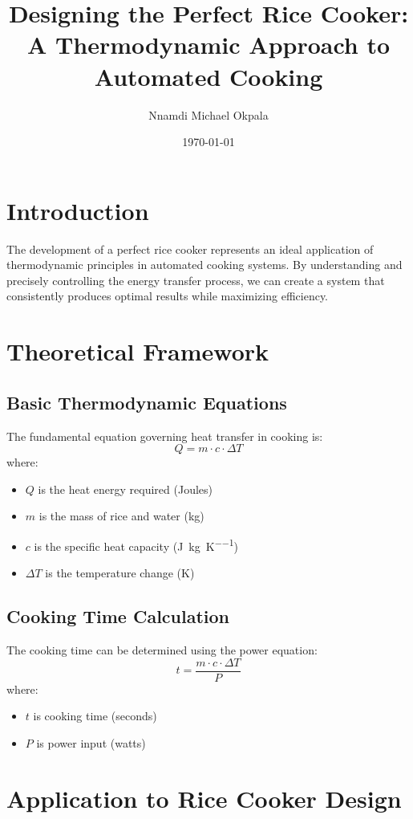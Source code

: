 \documentclass{article}
\title{Designing the Perfect Rice Cooker: \\A Thermodynamic Approach to Automated Cooking}
\author{Nnamdi Michael Okpala}
\date{\today}
\begin{document}
\maketitle

\section{Introduction}
The development of a perfect rice cooker represents an ideal application of thermodynamic principles in automated cooking systems. By understanding and precisely controlling the energy transfer process, we can create a system that consistently produces optimal results while maximizing efficiency.

\section{Theoretical Framework}
\subsection{Basic Thermodynamic Equations}
The fundamental equation governing heat transfer in cooking is:
\[
Q = m \cdot c \cdot \Delta T
\]
where:
\begin{itemize}
    \item $Q$ is the heat energy required (Joules)
    \item $m$ is the mass of rice and water (kg)
    \item $c$ is the specific heat capacity (\si{\joule\per\kilogram\per\kelvin})
    \item $\Delta T$ is the temperature change (K)
\end{itemize}

\subsection{Cooking Time Calculation}
The cooking time can be determined using the power equation:
\[
t = \frac{m \cdot c \cdot \Delta T}{P}
\]
where:
\begin{itemize}
    \item $t$ is cooking time (seconds)
    \item $P$ is power input (watts)
\end{itemize}

\section{Application to Rice Cooker Design}
\end{document}
